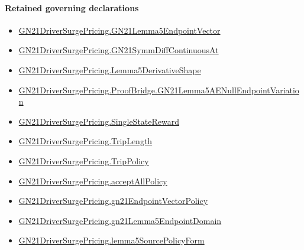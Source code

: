 \documentclass[10pt]{article}
\begin{document}
\paragraph{Retained governing declarations}
\begin{itemize}\raggedright
\item \hyperlink{governing-declaration-f1329aeb3f4d2e32}{GN21\allowbreak{}Driver\allowbreak{}Surge\allowbreak{}Pricing.\allowbreak{}GN21\allowbreak{}Lemma5\allowbreak{}Endpoint\allowbreak{}Vector}
\item \hyperlink{governing-declaration-1cbfd461a5d57e7c}{GN21\allowbreak{}Driver\allowbreak{}Surge\allowbreak{}Pricing.\allowbreak{}GN21\allowbreak{}Symm\allowbreak{}Diff\allowbreak{}Continuous\allowbreak{}At}
\item \hyperlink{paper-prerequisite-bdf8218f91905191}{GN21\allowbreak{}Driver\allowbreak{}Surge\allowbreak{}Pricing.\allowbreak{}Lemma5\allowbreak{}Derivative\allowbreak{}Shape}
\item \hyperlink{paper-prerequisite-d9323f0e5caa6a53}{GN21\allowbreak{}Driver\allowbreak{}Surge\allowbreak{}Pricing.\allowbreak{}Proof\allowbreak{}Bridge.\allowbreak{}GN21\allowbreak{}Lemma5\allowbreak{}AE\allowbreak{}Null\allowbreak{}Endpoint\allowbreak{}Variation}
\item \hyperlink{governing-declaration-f7708ce48623a5e0}{GN21\allowbreak{}Driver\allowbreak{}Surge\allowbreak{}Pricing.\allowbreak{}Single\allowbreak{}State\allowbreak{}Reward}
\item \hyperlink{governing-declaration-a616c143f22cf2bc}{GN21\allowbreak{}Driver\allowbreak{}Surge\allowbreak{}Pricing.\allowbreak{}Trip\allowbreak{}Length}
\item \hyperlink{governing-declaration-4312ad4cb899871f}{GN21\allowbreak{}Driver\allowbreak{}Surge\allowbreak{}Pricing.\allowbreak{}Trip\allowbreak{}Policy}
\item \hyperlink{governing-declaration-e94c9281d4f4b12d}{GN21\allowbreak{}Driver\allowbreak{}Surge\allowbreak{}Pricing.\allowbreak{}accept\allowbreak{}All\allowbreak{}Policy}
\item \hyperlink{governing-declaration-fd9edd847ccb0b95}{GN21\allowbreak{}Driver\allowbreak{}Surge\allowbreak{}Pricing.\allowbreak{}gn21\allowbreak{}Endpoint\allowbreak{}Vector\allowbreak{}Policy}
\item \hyperlink{governing-declaration-a843d1c76c4f49f8}{GN21\allowbreak{}Driver\allowbreak{}Surge\allowbreak{}Pricing.\allowbreak{}gn21\allowbreak{}Lemma5\allowbreak{}Endpoint\allowbreak{}Domain}
\item \hyperlink{governing-declaration-e4df3c35c7616cad}{GN21\allowbreak{}Driver\allowbreak{}Surge\allowbreak{}Pricing.\allowbreak{}lemma5\allowbreak{}Source\allowbreak{}Policy\allowbreak{}Form}

\end{itemize}
\end{document}
